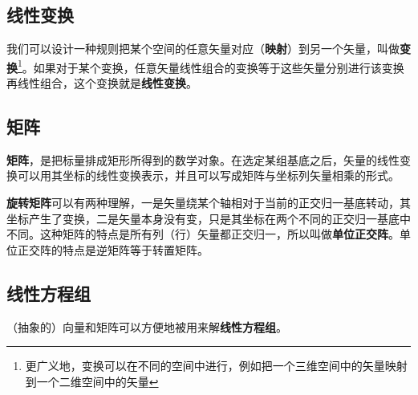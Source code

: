 \subsection{线性变换}

我们可以设计一种规则把某个空间的任意矢量对应（\textbf{映射}）到另一个矢量，叫做\textbf{变换}\footnote{更广义地，变换可以在不同的空间中进行，例如把一个三维空间中的矢量映射到一个二维空间中的矢量}。如果对于某个变换，任意矢量线性组合的变换等于这些矢量分别进行该变换再线性组合，这个变换就是\textbf{线性变换}。

\subsection{矩阵}

\textbf{矩阵}，是把标量排成矩形所得到的数学对象。在选定某组基底之后，矢量的线性变换可以用其坐标的线性变换表示，并且可以写成矩阵与坐标列矢量相乘的形式。


\textbf{旋转矩阵}可以有两种理解，一是矢量绕某个轴相对于当前的正交归一基底转动，其坐标产生了变换，二是矢量本身没有变，只是其坐标在两个不同的正交归一基底中不同。这种矩阵的特点是所有列（行）矢量都正交归一，所以叫做\textbf{单位正交阵}。单位正交阵的特点是逆矩阵等于转置矩阵。






\subsection{线性方程组}

（抽象的）向量和矩阵可以方便地被用来解\textbf{线性方程组}。
